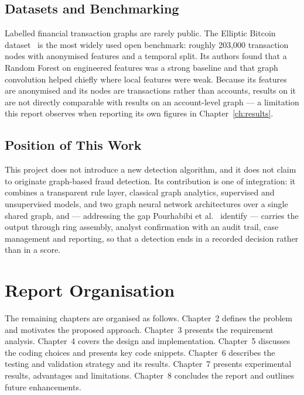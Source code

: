 \subsection{Datasets and Benchmarking}
Labelled financial transaction graphs are rarely public. The Elliptic Bitcoin dataset~\cite{weber2019} is the most widely used open benchmark: roughly 203,000 transaction nodes with anonymised features and a temporal split. Its authors found that a Random Forest on engineered features was a strong baseline and that graph convolution helped chiefly where local features were weak. Because its features are anonymised and its nodes are transactions rather than accounts, results on it are not directly comparable with results on an account-level graph --- a limitation this report observes when reporting its own figures in Chapter~\ref{ch:results}.

\subsection{Position of This Work}
This project does not introduce a new detection algorithm, and it does not claim to originate graph-based fraud detection. Its contribution is one of integration: it combines a transparent rule layer, classical graph analytics, supervised and unsupervised models, and two graph neural network architectures over a single shared graph, and --- addressing the gap Pourhabibi et al.~\cite{pourhabibi2020} identify --- carries the output through ring assembly, analyst confirmation with an audit trail, case management and reporting, so that a detection ends in a recorded decision rather than in a score.

\section{Report Organisation}
The remaining chapters are organised as follows. Chapter~2 defines the problem and motivates the proposed approach. Chapter~3 presents the requirement analysis. Chapter~4 covers the design and implementation. Chapter~5 discusses the coding choices and presents key code snippets. Chapter~6 describes the testing and validation strategy and its results. Chapter~7 presents experimental results, advantages and limitations. Chapter~8 concludes the report and outlines future enhancements.
